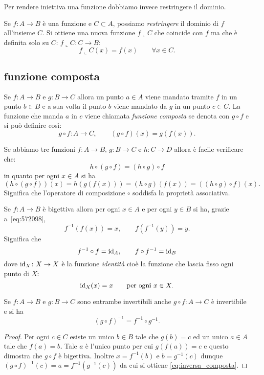 Per rendere iniettiva una funzione dobbiamo invece restringere il dominio.

\begin{definition}[restrizione]
  Se $f\colon A\to B$ è una funzione e $C\subset A$, possiamo 
  \emph{restringere} il dominio di $f$ all'insieme $C$.
  Si ottiene una nuova funzione $f\llcorner C$ che coincide con $f$
  ma che è definita solo su $C$: $f\llcorner C\colon C\to B$:
  \[
  f\llcorner C(x) = f(x)\qquad 
  \forall x \in C.
  \]
\end{definition}


\subsection{funzione composta}
%

Se $f\colon A\to B$ e $g\colon B\to C$ allora un punto $a\in A$ 
viene mandato tramite $f$ in un punto $b\in B$ e 
a sua volta il punto $b$ viene mandato da $g$ in un punto 
$c \in C$. 
La funzione che manda $a$ in $c$ viene chiamata 
\emph{funzione composta}%
%
 se denota con $g\circ f$ 
e si può definire così:
\[
g\circ f \colon A \to C, \qquad 
(g\circ f)(x) = g(f(x)).  
\]

Se abbiamo tre funzioni 
$f\colon A\to B$, $g\colon B\to C$ e $h\colon C\to D$ 
allora è facile verificare che:
\[
   h \circ (g\circ f) = (h\circ g) \circ f
\]
in quanto per ogni $x\in A$ si ha
\[
(h \circ (g\circ f)) (x) =
h(g(f(x))) = (h\circ g)(f(x)) = ((h\circ g) \circ f) (x).  
\]
Significa che l'operatore di composizione $\circ$
soddisfa la proprietà associativa.

Se $f\colon A\to B$ è bigettiva allora 
per ogni $x\in A$ e per ogni $y\in B$ si ha,
grazie a~\eqref{eq:572098},
\[
  f^{-1} (f(x)) = x,
  \qquad f(f^{-1}(y)) = y.
\]
Significa che 
\[
  f^{-1}\circ f = \mathrm{id}_A, 
  \qquad
  f\circ f^{-1} = \mathrm{id}_B
\] 
dove $\mathrm{id}_X\colon X\to X$
è la funzione 
\emph{identità}%
%
%
cioè la funzione 
che lascia fisso ogni punto di $X$:
%
\index{$\id$}%
\[
\mathrm{id}_X(x) = x \qquad \text{per ogni $x\in X$}.
\]

\begin{theorem}
Se $f\colon A\to B$ e $g\colon B\to C$ sono entrambe invertibili
anche $g\circ f\colon A\to C$ è invertibile e si ha 
\begin{equation}\label{eq:inversa_composta}
  (g\circ f)^{-1} = f^{-1}\circ g^{-1}.
\end{equation}
\end{theorem}
\begin{proof}    
Per ogni $c\in C$ esiste un unico $b\in B$ tale che $g(b)=c$ 
ed un unico $a\in A$ tale che $f(a)=b$. 
Tale $a$ è l'unico punto per cui $g(f(a))=c$ e questo dimostra che 
$g\circ f$ è bigettiva. Inoltre $x=f^{-1}(b)$ e $b=g^{-1}(c)$ 
dunque $(g\circ f)^{-1}(c) = a = f^{-1}(g^{-1}(c))$ da cui si ottiene 
\eqref{eq:inversa_composta}.
\end{proof}

